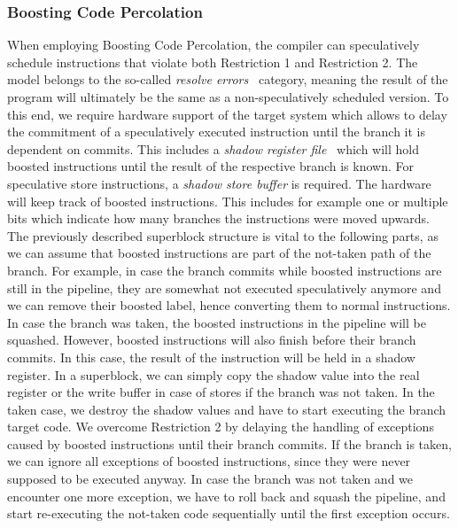 \subsubsection{Boosting Code Percolation}
When employing Boosting Code Percolation, the compiler can speculatively schedule instructions that violate both Restriction 1 and Restriction 2. The model belongs to the so-called \textit{resolve errors}~\cite{bringmannMH95} category, meaning the result of the program will ultimately be the same as a non-speculatively scheduled version. To this end, we require hardware support of the target system which allows to delay the commitment of a speculatively executed instruction until the branch it is dependent on commits. This includes a \textit{shadow register file}~\cite{10.1145/325096.325160} which will hold boosted instructions until the result of the respective branch is known. For speculative store instructions, a \textit{shadow store buffer} is required. The hardware will keep track of boosted instructions. This includes for example one or multiple bits which indicate how many branches the instructions were moved upwards. The previously described superblock structure is vital to the following parts, as we can assume that boosted instructions are part of the not-taken path of the branch. For example, in case the branch commits while boosted instructions are still in the pipeline, they are somewhat not executed speculatively anymore and we can remove their boosted label, hence converting them to normal instructions. In case the branch was taken, the boosted instructions in the pipeline will be squashed. However, boosted instructions will also finish before their branch commits. In this case, the result of the instruction will be held in a shadow register. In a superblock, we can simply copy the shadow value into the real register or the write buffer in case of stores if the branch was not taken. In the taken case, we destroy the shadow values and have to start executing the branch target code. We overcome Restriction 2 by delaying the handling of exceptions caused by boosted instructions until their branch commits. If the branch is taken, we can ignore all exceptions of boosted instructions, since they were never supposed to be executed anyway. In case the branch was not taken and we encounter one more exception, we have to roll back and squash the pipeline, and start re-executing the not-taken code sequentially until the first exception occurs.
